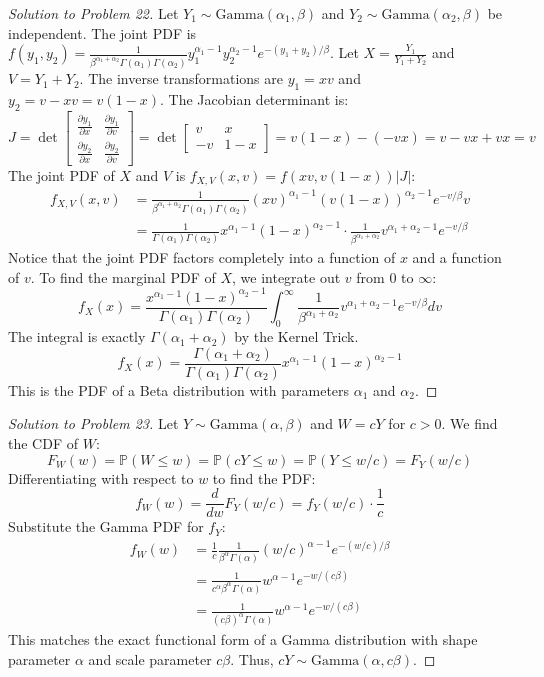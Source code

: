 \documentclass[11pt, a4paper]{article}
\theoremstyle{definition}
\theoremstyle{remark}
\newcommand{\Prob}{\mathbb{P}}
\begin{document}
\begin{proof}[Solution to Problem 22]
Let $Y_1 \sim \text{Gamma}(\alpha_1, \beta)$ and $Y_2 \sim \text{Gamma}(\alpha_2, \beta)$ be independent.
The joint PDF is $f(y_1, y_2) = \frac{1}{\beta^{\alpha_1+\alpha_2}\Gamma(\alpha_1)\Gamma(\alpha_2)} y_1^{\alpha_1-1} y_2^{\alpha_2-1} e^{-(y_1+y_2)/\beta}$.
Let $X = \frac{Y_1}{Y_1 + Y_2}$ and $V = Y_1 + Y_2$.
The inverse transformations are $y_1 = xv$ and $y_2 = v - xv = v(1-x)$.
The Jacobian determinant is:
\[ J = \det \begin{bmatrix} \frac{\partial y_1}{\partial x} & \frac{\partial y_1}{\partial v} \\ \frac{\partial y_2}{\partial x} & \frac{\partial y_2}{\partial v} \end{bmatrix} = \det \begin{bmatrix} v & x \\ -v & 1-x \end{bmatrix} = v(1-x) - (-vx) = v - vx + vx = v \]
The joint PDF of $X$ and $V$ is $f_{X,V}(x, v) = f(xv, v(1-x)) |J|$:
\begin{align*}
f_{X,V}(x, v) &= \frac{1}{\beta^{\alpha_1+\alpha_2}\Gamma(\alpha_1)\Gamma(\alpha_2)} (xv)^{\alpha_1-1} (v(1-x))^{\alpha_2-1} e^{-v/\beta} v \\
&= \frac{1}{\Gamma(\alpha_1)\Gamma(\alpha_2)} x^{\alpha_1-1} (1-x)^{\alpha_2-1} \cdot \frac{1}{\beta^{\alpha_1+\alpha_2}} v^{\alpha_1+\alpha_2-1} e^{-v/\beta}
\end{align*}
Notice that the joint PDF factors completely into a function of $x$ and a function of $v$. To find the marginal PDF of $X$, we integrate out $v$ from $0$ to $\infty$:
\[ f_X(x) = \frac{x^{\alpha_1-1} (1-x)^{\alpha_2-1}}{\Gamma(\alpha_1)\Gamma(\alpha_2)} \int_0^\infty \frac{1}{\beta^{\alpha_1+\alpha_2}} v^{\alpha_1+\alpha_2-1} e^{-v/\beta} dv \]
The integral is exactly $\Gamma(\alpha_1+\alpha_2)$ by the Kernel Trick.
\[ f_X(x) = \frac{\Gamma(\alpha_1+\alpha_2)}{\Gamma(\alpha_1)\Gamma(\alpha_2)} x^{\alpha_1-1} (1-x)^{\alpha_2-1} \]
This is the PDF of a Beta distribution with parameters $\alpha_1$ and $\alpha_2$.
\end{proof}

\begin{proof}[Solution to Problem 23]
Let $Y \sim \text{Gamma}(\alpha, \beta)$ and $W = cY$ for $c > 0$.
We find the CDF of $W$:
\[ F_W(w) = \Prob(W \le w) = \Prob(cY \le w) = \Prob(Y \le w/c) = F_Y(w/c) \]
Differentiating with respect to $w$ to find the PDF:
\[ f_W(w) = \frac{d}{dw} F_Y(w/c) = f_Y(w/c) \cdot \frac{1}{c} \]
Substitute the Gamma PDF for $f_Y$:
\begin{align*}
f_W(w) &= \frac{1}{c} \frac{1}{\beta^\alpha \Gamma(\alpha)} (w/c)^{\alpha-1} e^{-(w/c)/\beta} \\
&= \frac{1}{c^\alpha \beta^\alpha \Gamma(\alpha)} w^{\alpha-1} e^{-w/(c\beta)} \\
&= \frac{1}{(c\beta)^\alpha \Gamma(\alpha)} w^{\alpha-1} e^{-w/(c\beta)}
\end{align*}
This matches the exact functional form of a Gamma distribution with shape parameter $\alpha$ and scale parameter $c\beta$. Thus, $cY \sim \text{Gamma}(\alpha, c\beta)$.
\end{proof}
\end{document}
